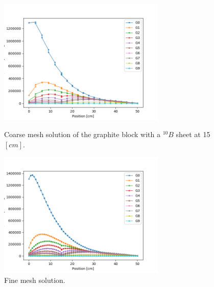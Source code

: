 \begin{figure}
        \centering
        \begin{minipage}{.48\textwidth}
            \centering
            \includegraphics[width=8cm]{results/scflux_graphite_beam_3.png}
            \caption{Coarse mesh solution of the graphite block with a $^{10}B$ sheet at 15$[cm]$. }
            \label{gb_3}
        \end{minipage}%
        \begin{minipage}{.48\textwidth}
            \centering
            \includegraphics[width=8cm]{results/scflux_graphite_beam_4.png}
            \caption{Fine mesh solution. 
       }
        \end{minipage}
    \end{figure}